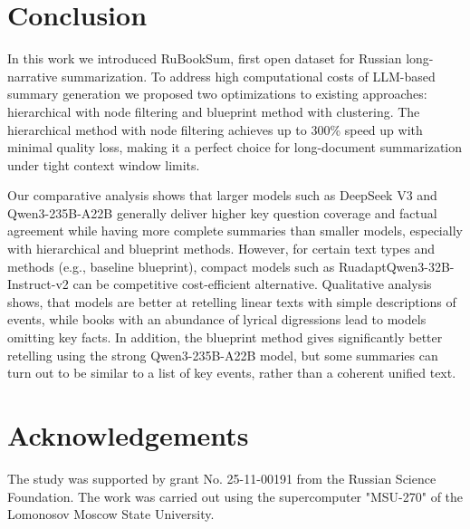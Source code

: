 \documentclass{superfri}
\begin{document}

\section*{Conclusion}
In this work we introduced RuBookSum, first open dataset for Russian long-narrative summarization.
To address high computational costs of LLM-based summary generation we proposed two optimizations to existing approaches: 
hierarchical with node filtering and blueprint method with clustering.
The hierarchical method with node filtering achieves up to 300\% speed up with minimal quality loss,
making it a perfect choice for long-document summarization under tight context window limits.

Our comparative analysis shows that larger models such as DeepSeek V3 and Qwen3-235B-A22B generally deliver higher key question coverage and factual agreement
while having more complete summaries than smaller models, especially with hierarchical and blueprint methods.
However, for certain text types and methods (e.g., baseline blueprint), compact models such as RuadaptQwen3-32B-Instruct-v2 can be competitive cost-efficient alternative.
Qualitative analysis shows, that models are better at retelling linear texts with simple descriptions of events, while books with an abundance of lyrical digressions 
lead to models omitting key facts. In addition, the blueprint method gives significantly better retelling using the strong Qwen3-235B-A22B model, 
but some summaries can turn out to be similar to a list of key events, rather than a coherent unified text.


\section*{Acknowledgements}
The study was supported by grant No. 25-11-00191 from the Russian Science Foundation.
The work was carried out using the supercomputer "MSU-270" of the Lomonosov Moscow State University.

\openaccess
\end{document}
